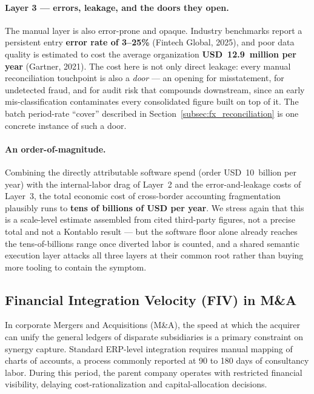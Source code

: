 \paragraph{Layer 3 --- errors, leakage, and the doors they open.} The manual
layer is also error-prone and opaque. Industry benchmarks report a persistent
entry \textbf{error rate of 3--25\%} (Fintech Global, 2025), and poor data
quality is estimated to cost the average organization \textbf{USD~12.9~million
per year} (Gartner, 2021). The cost here is not only direct leakage: every manual
reconciliation touchpoint is also a \emph{door} --- an opening for misstatement,
for undetected fraud, and for audit risk that compounds downstream, since an
early mis-classification contaminates every consolidated figure built on top of
it. The batch period-rate ``cover'' described in
Section~\ref{subsec:fx_reconciliation} is one concrete instance of such a door.

\paragraph{An order-of-magnitude.} Combining the directly attributable software
spend (order USD~10~billion per year) with the internal-labor drag of Layer~2 and
the error-and-leakage costs of Layer~3, the total economic cost of cross-border
accounting fragmentation plausibly runs to \textbf{tens of billions of USD per
year}. We stress again that this is a scale-level estimate assembled from cited
third-party figures, not a precise total and not a Kontablo result --- but the
software floor alone already reaches the tens-of-billions range once diverted
labor is counted, and a shared semantic execution layer attacks all three layers
at their common root rather than buying more tooling to contain the symptom.

\subsection{Financial Integration Velocity (FIV) in M\&A}
In corporate Mergers and Acquisitions (M\&A), the speed at which the acquirer can unify the general ledgers of disparate subsidiaries is a primary constraint on synergy capture. Standard ERP-level integration requires manual mapping of charts of accounts, a process commonly reported at 90 to 180 days of consultancy labor. During this period, the parent company operates with restricted financial visibility, delaying cost-rationalization and capital-allocation decisions.

